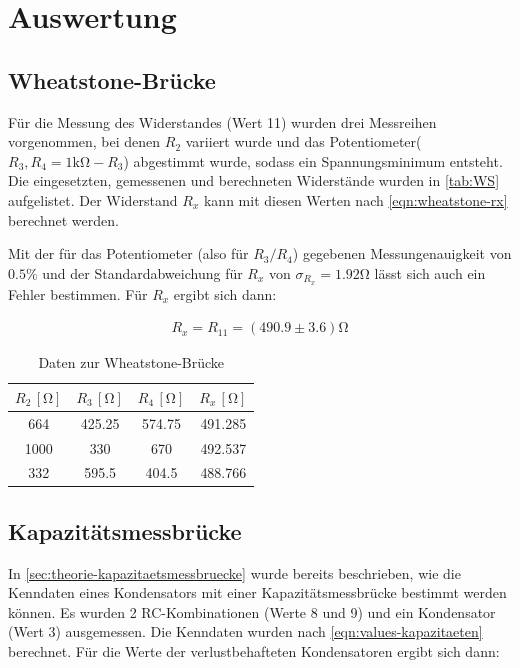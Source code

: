 \section{Auswertung}
\label{sec:Auswertung}

\subsection{Wheatstone-Brücke}
Für die Messung des Widerstandes (Wert 11) wurden drei Messreihen vorgenommen, bei denen $R_2$ variiert wurde und das Potentiometer($R_3, R_4=1\si{\kilo}\si{\ohm}-R_3$) abgestimmt wurde, sodass ein Spannungsminimum entsteht. Die eingesetzten, gemessenen und berechneten  Widerstände wurden in \autoref{tab:WS} aufgelistet. Der Widerstand $R_x$ kann mit diesen Werten nach \autoref{eqn:wheatstone-rx} berechnet werden.

Mit der für das Potentiometer (also für $R_3/R_4$) gegebenen Messungenauigkeit von $0.5\%$ und der Standardabweichung für $R_x$ von $\sigma_{R_x}=1.92 \si{\ohm}$ lässt sich auch ein Fehler bestimmen. Für $R_x$ ergibt sich dann: 

\begin{align}
  R_x=R_{11}=(490.9 \pm 3.6)\si{\ohm}
\end{align}

\begin{table}
  \centering
  \caption{Daten zur Wheatstone-Brücke}
  \label{tab:WS}
  \begin{tabular}{c c c c}
  \toprule
  $R_2 \, [\si{\ohm}]$ &$R_3 \, [\si{\ohm}]$ &$R_4 \, [\si{\ohm}]$ & $R_x \, [\si{\ohm}]$\\
  \midrule
   664 & 425.25 & 574.75& 491.285\\
   1000 & 330 & 670 & 492.537 \\
   332 & 595.5 & 404.5 & 488.766 \\
  \bottomrule
  \end{tabular}
\end{table}
\subsection{Kapazitätsmessbrücke}
\label{sec:akap}
In \autoref{sec:theorie-kapazitaetsmessbruecke} wurde bereits beschrieben, wie die Kenndaten eines Kondensators mit einer Kapazitätsmessbrücke bestimmt werden können. Es wurden 2 RC-Kombinationen (Werte 8 und 9) und ein Kondensator (Wert 3) ausgemessen. Die Kenndaten wurden nach \autoref{eqn:values-kapazitaeten} berechnet.
Für die Werte der verlustbehafteten Kondensatoren ergibt sich dann:

